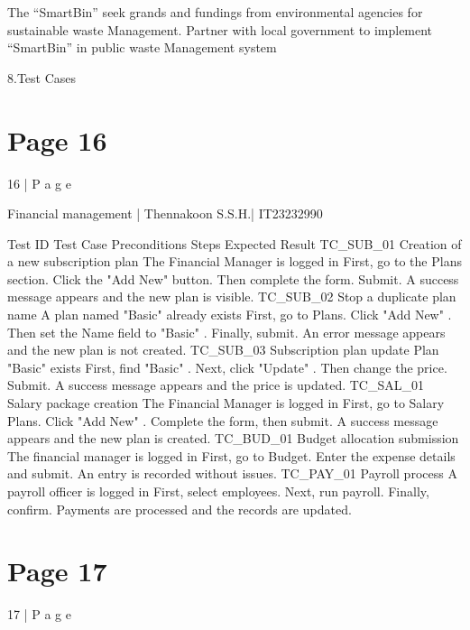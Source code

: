 \documentclass{article}
\begin{document}
The “SmartBin” seek grands and fundings from environmental agencies for sustainable 
waste Management. Partner with local government to implement “SmartBin” in public 
waste Management system 
 
 
 
 
 
 
 
 
 
 
 
 
 
 
 
 
 
8.Test Cases 
 

\section*{Page 16}
16 | P a g e 
 
Financial management  | Thennakoon S.S.H.| IT23232990 
 
 
Test ID Test Case Preconditions Steps Expected Result 
TC\_SUB\_01 Creation of a 
new 
subscription 
plan 
The Financial 
Manager is 
logged in 
First, go to the Plans 
section. Click the 
"Add New" button. 
Then complete the 
form. Submit. 
A success message 
appears and the new 
plan is visible. 
TC\_SUB\_02 Stop a 
duplicate plan 
name 
A plan named 
"Basic" already 
exists 
First, go to Plans. 
Click "Add New" . 
Then set the Name 
field to "Basic" . 
Finally, submit. 
An error message 
appears and the new 
plan is not created. 
TC\_SUB\_03 Subscription 
plan update 
Plan "Basic" 
exists 
First, find "Basic" . 
Next, click "Update" . 
Then change the 
price. Submit. 
A success message 
appears and the price 
is updated. 
TC\_SAL\_01 Salary package 
creation 
The Financial 
Manager is 
logged in 
First, go to Salary 
Plans. Click "Add 
New" . Complete the 
form, then submit. 
A success message 
appears and the new 
plan is created. 
TC\_BUD\_01 Budget 
allocation 
submission 
The financial 
manager is 
logged in 
First, go to Budget. 
Enter the expense 
details and submit. 
An entry is recorded 
without issues. 
TC\_PAY\_01 Payroll process A payroll officer 
is logged in 
First, select 
employees. Next, 
run payroll. Finally, 
confirm. 
Payments are 
processed and the 
records are updated. 

\section*{Page 17}
17 | P a g e 
 
 
 
\end{document}
